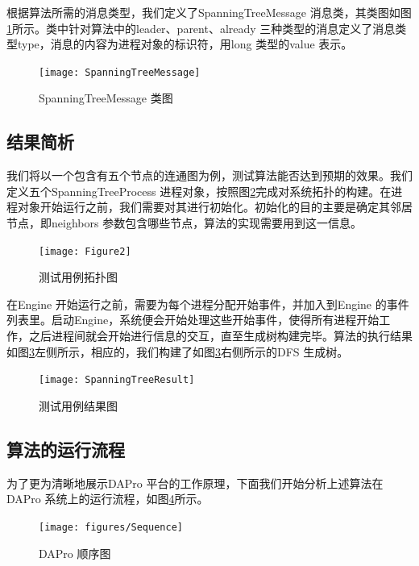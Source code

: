     根据算法所需的消息类型，我们定义了SpanningTreeMessage 消息类，其类图如图\ref{SpanningTreeMessage}所示。类中针对算法中的leader、parent、already 三种类型的消息定义了消息类型type，消息的内容为进程对象的标识符，用long 类型的value 表示。
    \begin{figure}[ht]
        \centering
        \texttt{[image: SpanningTreeMessage]}\\
        \caption{SpanningTreeMessage 类图}\label{SpanningTreeMessage}
    \end{figure}

    \subsection{结果简析}
    我们将以一个包含有五个节点的连通图为例，测试算法能否达到预期的效果。我们定义五个SpanningTreeProcess 进程对象，按照图\ref{Figure2}完成对系统拓扑的构建。在进程对象开始运行之前，我们需要对其进行初始化。初始化的目的主要是确定其邻居节点，即neighbors 参数包含哪些节点，算法的实现需要用到这一信息。
    \begin{figure}[ht]
        \centering
        \texttt{[image: Figure2]}\\
        \caption{测试用例拓扑图}\label{Figure2}
    \end{figure}

    在Engine 开始运行之前，需要为每个进程分配开始事件，并加入到Engine 的事件列表里。启动Engine，系统便会开始处理这些开始事件，使得所有进程开始工作，之后进程间就会开始进行信息的交互，直至生成树构建完毕。算法的执行结果如图\ref{SpanningTreeResult}左侧所示，相应的，我们构建了如图\ref{SpanningTreeResult}右侧所示的DFS 生成树。
    \begin{figure}[ht]
        \centering
        \texttt{[image: SpanningTreeResult]}\\
        \caption{测试用例结果图}\label{SpanningTreeResult}
    \end{figure}

    \subsection{算法的运行流程}
    为了更为清晰地展示DAPro 平台的工作原理，下面我们开始分析上述算法在DAPro 系统上的运行流程，如图\ref{Sequence}所示。

    \begin{figure}[ht]
        \centering
        \texttt{[image: figures/Sequence]}\\
        \caption{DAPro 顺序图}\label{Sequence}
    \end{figure}

